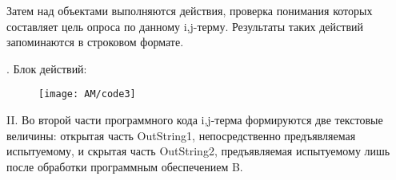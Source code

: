 %
%
%
%
%
%
%
%
%

Затем над объектами выполняются действия, проверка понимания которых составляет цель опроса по данному
\foreignlanguage{english}{i},\foreignlanguage{english}{j}{}-терму. Результаты таких действий запоминаются в строковом
формате.

{. Блок действий:
	\par}

	\begin{figure}[H]
		\texttt{[image: AM/code3]}
	\end{figure}

%
%
%
%
%
%

\foreignlanguage{english}{II}. Во второй части программного кода
\foreignlanguage{english}{i},\foreignlanguage{english}{j}{}-терма формируются две текстовые величины: открытая часть
OutString1, непосредственно предъявляемая испытуемому, и скрытая часть OutString2, предъявляемая испытуемому лишь после
обработки программным обеспечением \foreignlanguage{english}{B}.

